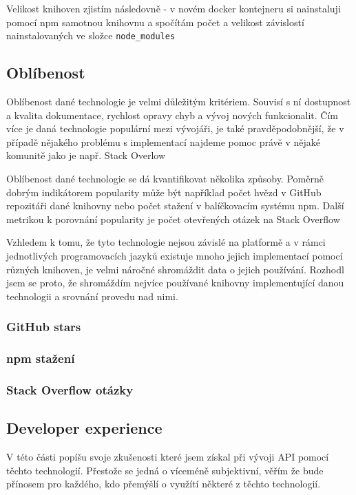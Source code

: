 \documentclass[thesis=M,czech]{FITthesis}[2019/12/23]
\begin{document}
Velikost knihoven zjistím následovně - v novém docker kontejneru si nainstaluji pomocí npm samotnou knihovnu a spočítám počet a velikost závislostí nainstalovaných ve složce \texttt{node_modules}


\subsection{Oblíbenost}
Oblíbenost dané technologie je velmi důležitým kritériem. Souvisí s ní dostupnost a kvalita dokumentace, rychlost opravy chyb a vývoj nových funkcionalit. Čím více je daná technologie populární mezi vývojáři, je také pravděpodobnější, že v případě nějakého problému s implementací najdeme pomoc právě v nějaké komunitě jako je např. Stack Overlow%

Oblíbenost dané technologie se dá kvantifikovat několika způsoby. Poměrně dobrým indikátorem popularity může být například počet hvězd v GitHub repozitáři dané knihovny nebo počet stažení v balíčkovacím systému npm. Další metrikou k porovnání popularity je počet otevřených otázek na Stack Overflow

Vzhledem k tomu, že tyto technologie nejsou závislé na platformě a v rámci jednotlivých programovacích jazyků existuje mnoho jejich implementací pomocí různých knihoven, je velmi náročné shromáždit data o jejich používání. Rozhodl jsem se proto, že shromáždím nejvíce používané knihovny implementující danou technologii a srovnání provedu nad nimi.

\subsubsection*{GitHub stars}

\subsubsection*{npm stažení}

\subsubsection*{Stack Overflow otázky}

\subsection{Developer experience}
V této části popíšu svoje zkušenosti které jsem získal při vývoji API pomocí těchto technologií. Přestože se jedná o víceméně subjektivní, věřím že bude přínosem pro každého, kdo přemýšlí o využítí některé z těchto technologií.
\end{document}
